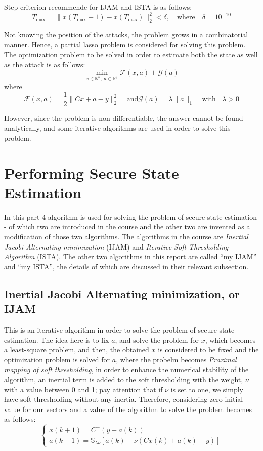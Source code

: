 Step criterion recommende for IJAM and ISTA is as follows:
\[
T_{\max} = \| x(T_{\max}+1) - x(T_{\max}) \|_2^2 < \delta, \quad \text{where} \quad \delta = 10^{-10}
\]

Not knowing the position of the attacks, the problem grows in a combinatorial manner. Hence, a partial lasso problem is considered for solving this problem. The optimization problem to be solved in order to estimate both the state as well as the attack is as follows:
\begin{equation}
    \min\limits_{x \in \mathbb{R}^n, \: a \in \mathbb{R}^q} \mathcal{F}(x,a) + \mathcal{G}(a)
\end{equation}
where 
\[
\mathcal{F}(x,a) = \frac{1}{2} \|Cx + a - y\|_2^2  \:\:\:\:\: \text{and} \mathcal{G}(a) = \lambda \|a\|_1 \:\:\:\:\ \text{with} \:\:\:\:\lambda >0
\]

However, since the problem is non-differentiable, the answer cannot be found analytically, and some iterative algorithms are used in order to solve this problem.


\section{Performing Secure State Estimation}
In this part 4 algorithm is used for solving the problem of secure state estimation - of which two are introduced in the course and the other two are invented as a modification of those two algorithms. The algorithms in the course are \textit{Inertial Jacobi Alternating minimization} (IJAM) and \textit{Iterative Soft Thresholding Algorithm} (ISTA). The other two algorithms in this report are called ``my IJAM'' and ``my ISTA'', the details of which are discussed in their relevant subsection.

\subsection{Inertial Jacobi Alternating minimization, or IJAM}
This is an iterative algorithm in order to solve the problem of secure state estimation. The idea here is to fix $a$, and solve the problem for $x$, which becomes a least-square problem, and then, the obtained $x$ is considered to be fixed and the optimization problem is solved for $a$, where the probelm becomes \textit{Proximal mapping of soft thresholding}, in order to enhance the numerical stability of the algorithm, an inertial term is added to the soft thresholding with the weight, $\nu$ with a value between 0 and 1; pay attention that if $\nu$ is set to one, we simply have soft thresholding without any inertia. Therefore, considering zero initial value for our vectors and a value of  the algorithm to solve the problem becomes as follows:
\begin{equation}
	\begin{cases}
		x(k+1) = C^{+}(y - a(k)) \\
		a(k+1) = \mathbb{S}_{\lambda \nu}\left[a(k) - \nu(Cx(k)+ a(k) - y)\right]
	\end{cases}
\end{equation}

